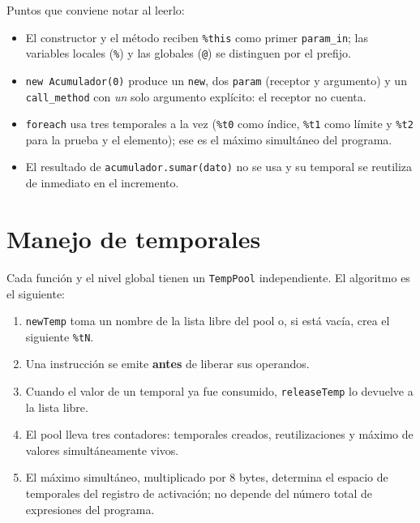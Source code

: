 \documentclass[11pt,a4paper]{article}
\begin{document}
Puntos que conviene notar al leerlo:

\begin{itemize}[leftmargin=1.4em]
  \item El constructor y el método reciben \texttt{\%this} como primer
        \texttt{param\_in}; las variables locales (\texttt{\%}) y las globales
        (\texttt{@}) se distinguen por el prefijo.
  \item \texttt{new Acumulador(0)} produce un \texttt{new}, dos \texttt{param}
        (receptor y argumento) y un \texttt{call\_method} con \emph{un} solo
        argumento explícito: el receptor no cuenta.
  \item \texttt{foreach} usa tres temporales a la vez (\texttt{\%t0} como índice,
        \texttt{\%t1} como límite y \texttt{\%t2} para la prueba y el elemento);
        ese es el máximo simultáneo del programa.
  \item El resultado de \texttt{acumulador.sumar(dato)} no se usa y su temporal
        se reutiliza de inmediato en el incremento.
\end{itemize}

\section{Manejo de temporales}

Cada función y el nivel global tienen un \texttt{TempPool} independiente. El
algoritmo es el siguiente:

\begin{enumerate}[leftmargin=1.6em]
  \item \texttt{newTemp} toma un nombre de la lista libre del pool o, si está
        vacía, crea el siguiente \texttt{\%tN}.
  \item Una instrucción se emite \textbf{antes} de liberar sus operandos.
  \item Cuando el valor de un temporal ya fue consumido, \texttt{releaseTemp} lo
        devuelve a la lista libre.
  \item El pool lleva tres contadores: temporales creados, reutilizaciones y
        máximo de valores simultáneamente vivos.
  \item El máximo simultáneo, multiplicado por 8 bytes, determina el espacio de
        temporales del registro de activación; no depende del número total de
        expresiones del programa.
\end{enumerate}
\end{document}
